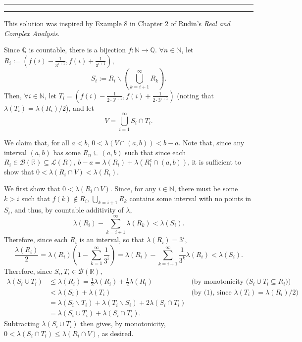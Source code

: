 \documentclass[11pt]{article}
\newcounter{questionCounter}
\newcounter{partCounter}[questionCounter]
\newenvironment{question}[2][\arabic{questionCounter}]{%
    \setcounter{partCounter}{0}%
    \vspace{.25in} \hrule \vspace{0.5em}%
        \noindent{\bf #2}%
    \vspace{0.8em} \hrule \vspace{.10in}%
    \addtocounter{questionCounter}{1}%
}{}
\newcommand{\sminus}{\backslash}
\newcommand{\N}{\mathbb{N}} %
\newcommand{\Q}{\mathbb{Q}} %
\newcommand{\R}{\mathbb{R}} %
\newcommand{\B}{\mathcal{B}} %
\begin{document}
\begin{question}{Problem 5}
This solution was inspired by Example 8 in Chapter 2 of Rudin's \emph{Real and
Complex Analysis}.

Since $\Q$ is countable, there is a bijection $f: \N \rightarrow \Q$.
$\forall n \in \N$, let
$R_i := (f(i) - \frac{1}{3^{i + 1}},f(i) + \frac{1}{3^{i + 1}})$,
\[S_i := R_i \sminus \left( \bigcup_{k = i + 1}^{\infty} R_k \right).\]
Then, $\forall i \in \N$, let
$T_i
 = (f(i) - \frac{1}{2 \cdot 3^{i + 1}},f(i) + \frac{1}{2 \cdot 3^{i + 1}})$
(noting that $\lambda(T_i) = \lambda(R_i)/2$), and let
\[V = \bigcup_{i = 1}^{\infty} S_i \cap T_i.\]

We claim that, for all $a < b$, $0 < \lambda(V \cap (a,b)) < b - a$. Note
that, since any interval $(a,b)$ has some $R_n \subseteq (a,b)$ such that
since each $R_i \in \B(\R) \subseteq \mathcal{L}{(R)}$,
$b - a = \lambda(R_i) + \lambda(R_i^c \cap (a,b))$, it is sufficient to show
that $0 < \lambda(R_i \cap V) < \lambda(R_i)$.

We first show that $0 < \lambda(R_i \cap V)$.
Since, for any $i \in \N$, there must be some $k > i$ such that
$f(k) \not \in R_i$, $\bigcup_{k = i + 1} R_k$ contains some interval with no
points in $S_i$, and thus, by countable additivity of $\lambda$,
\[\lambda(R_i) - \sum_{k = i + 1}^{\infty} \lambda(R_k) < \lambda(S_i).\]
Therefore, since each $R_i$ is an interval, so that $\lambda(R_i) = 3^i$,
\begin{equation}
\frac{\lambda(R_i)}{2}
 = \lambda(R_i)\left( 1 - \sum_{k = 1}^{\infty} \frac{1}{3^i} \right)
 = \lambda(R_i) - \sum_{k = i + 1}^{\infty} \frac{1}{3^{k}}\lambda(R_i)
 < \lambda(S_i).
\end{equation}
Therefore, since $S_i,T_i \in \B(\R)$,
\begin{align*}
\lambda(S_i \cup T_i)
 & \leq \lambda(R_i) = \frac12 \lambda(R_i) + \frac12 \lambda(R_i )
                  & \mbox{(by monotonicity ($S_i \cup T_i \subseteq R_i$))} \\
 & <    \lambda(S_i) + \lambda(T_i)
                   & \mbox{(by (1), since $\lambda(T_i) = \lambda(R_i)/2$)} \\
 & =    \lambda(S_i \sminus T_i) + \lambda(T_i \sminus S_i) + 2\lambda(S_i \cap T_i) \\
 & =    \lambda(S_i \cup T_i) + \lambda(S_i \cap T_i).
\end{align*}
Subtracting $\lambda(S_i \cup T_i)$ then gives, by monotonicity,
$0 < \lambda(S_i \cap T_i) \leq \lambda(R_i \cap V)$, as desired.


\end{question}
\end{document}

